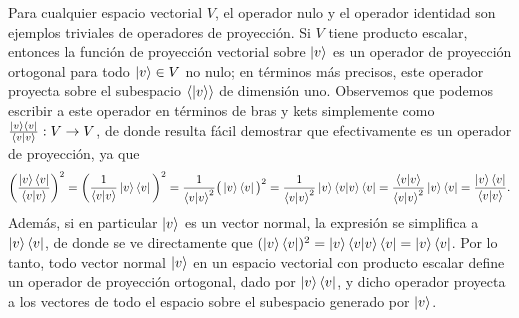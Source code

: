 \documentclass[12pt,dvipsnames]{article}
\begin{document}
\vspace{3mm}
Para cualquier espacio vectorial $V$, el operador nulo y el operador identidad son ejemplos triviales de operadores de proyección. Si $V$ tiene producto escalar, entonces la función de proyección vectorial sobre $\ket{v}$ es un operador de proyección ortogonal para todo $\ket{v}\in V$ no nulo; en términos más precisos, este operador proyecta sobre el subespacio $\langle \ket{v} \rangle$ de dimensión uno. Observemos que podemos escribir a este operador en términos de bras y kets simplemente como $\frac{\ket{v}\bra{v}}{\braket{v|v}}:V\to V$, de donde resulta fácil demostrar que efectivamente es un operador de proyección, ya que \[
    \bigg( \frac{\ket{v}\bra{v}}{\braket{v|v}}\bigg)^2=\bigg(\frac{1}{\braket{v|v}}\ket{v}\bra{v}\bigg)^2=\frac{1}{\braket{v|v}^2}\big(\ket{v}\bra{v}\big)^2=\frac{1}{\braket{v|v}^2}\ket{v}\braket{v|v}\bra{v}=\frac{\braket{v|v}}{\braket{v|v}^2}\ket{v}\bra{v}=\frac{\ket{v}\bra{v}}{\braket{v|v}}.
\] Además, si en particular $\ket{v}$ es un vector normal, la expresión se simplifica a $\ket{v}\bra{v}$, de donde se ve directamente que $(\ket{v}\bra{v})^2=\ket{v}\braket{v|v}\bra{v}=\ket{v}\bra{v}$. Por lo tanto, todo vector normal $\ket{v}$ en un espacio vectorial con producto escalar define un operador de proyección ortogonal, dado por $\ket{v}\bra{v}$, y dicho operador proyecta a los vectores de todo el espacio sobre el subespacio generado por $\ket{v}$.
\end{document}
